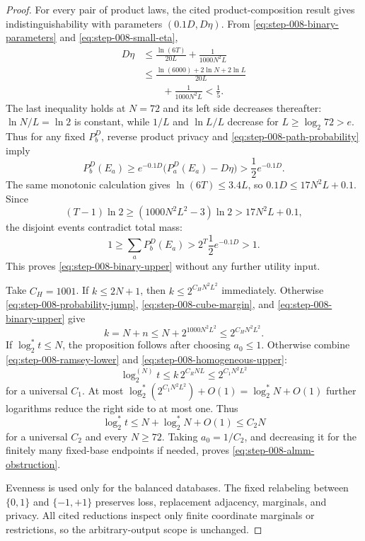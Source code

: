 \begin{proof}
For every pair of product laws, the cited product-composition result gives
indistinguishability with parameters \((0.1D,D\eta)\).  From
\eqref{eq:step-008-binary-parameters} and
\eqref{eq:step-008-small-eta},
\begin{equation}\label{eq:step-008-product-delta}
\begin{split}
D\eta
&\le\frac{\ln(6T)}{20L}+\frac1{1000N^2L}\\
&\le\frac{\ln(6000)+2\ln N+2\ln L}{20L}\\
&\qquad+\frac1{1000N^2L}<\frac15.
\end{split}
\end{equation}
The last inequality holds at \(N=72\) and its left side decreases
thereafter: \(\ln N/L=\ln2\) is constant, while \(1/L\) and
\(\ln L/L\) decrease for \(L\ge\log_2 72>e\).  Thus for any fixed
\(P_b^D\), reverse product privacy and
\eqref{eq:step-008-path-probability} imply
\begin{equation}\label{eq:step-008-reverse-product-privacy}
P_b^D(E_a)
\ge e^{-0.1D}\bigl(P_a^D(E_a)-D\eta\bigr)
>\frac12e^{-0.1D}.
\end{equation}
The same monotonic calculation gives \(\ln(6T)\le3.4L\), so
\(0.1D\le17N^2L+0.1\).  Since
\[
(T-1)\ln2
\ge(1000N^2L^2-3)\ln2
>17N^2L+0.1,
\]
the disjoint events contradict total mass:
\[
1\ge\sum_aP_b^D(E_a)
>2^T\frac12e^{-0.1D}>1.
\]
This proves \eqref{eq:step-008-binary-upper} without any further utility
input.

Take \(C_H=1001\).  If \(k\le2N+1\), then
\(k\le2^{C_HN^2L^2}\) immediately.  Otherwise
\eqref{eq:step-008-probability-jump},
\eqref{eq:step-008-cube-margin}, and
\eqref{eq:step-008-binary-upper} give
\begin{equation}\label{eq:step-008-homogeneous-upper}
k=N+n
\le N+2^{1000N^2L^2}
\le2^{C_HN^2L^2}.
\end{equation}
If \(\log_2^*t\le N\), the proposition follows after choosing
\(a_0\le1\).  Otherwise combine
\eqref{eq:step-008-ramsey-lower} and
\eqref{eq:step-008-homogeneous-upper}:
\begin{equation}\label{eq:step-008-iterate-upper}
\log_2^{(N)}t
\le k\,2^{C_RNL}
\le2^{C_1N^2L^2}
\end{equation}
for a universal \(C_1\).  At most
\(\log_2^*(2^{C_1N^2L^2})+O(1)=\log_2^*N+O(1)\) further logarithms reduce
the right side to at most one.  Thus
\[
\log_2^*t\le N+\log_2^*N+O(1)\le C_2N
\]
for a universal \(C_2\) and every \(N\ge72\).  Taking
\(a_0=1/C_2\), and decreasing it for the finitely many fixed-base
endpoints if needed, proves \eqref{eq:step-008-almm-obstruction}.

Evenness is used only for the balanced databases.  The fixed relabeling
between \(\{0,1\}\) and \(\{-1,+1\}\) preserves loss, replacement
adjacency, marginals, and privacy.  All cited reductions inspect only
finite coordinate marginals or restrictions, so the arbitrary-output
scope is unchanged.
\end{proof}

